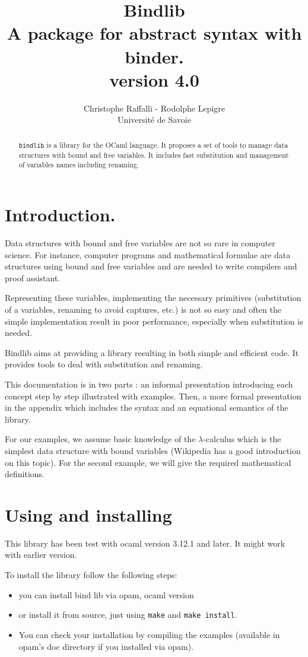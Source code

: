\documentclass[11pt]{article}
\title{Bindlib \\ A package for abstract syntax with binder. \\
          version 4.0}
\author{Christophe Raffalli - Rodolphe Lepigre\\
Université de Savoie}
\begin{document}
\maketitle

\begin{abstract}
  \verb!bindlib! is a library for the
OCaml language. It proposes a set of tools to manage data structures
with bound and free variables. It includes fast substitution and management
of variables names including renaming.
\end{abstract}

\tableofcontents

\section{Introduction.}

Data structures with bound and free variables are not so rare in
computer science. For instance, computer programs and mathematical
formulae are data structures using bound and free variables and are needed to write
compilers and proof assistant.

Representing these variables, implementing the necessary primitives
(substitution
of a variables, renaming to avoid captures, etc.) is not so easy and
often the simple implementation result in poor performance, especially
when substitution is needed.

Bindlib aims at providing a library resulting in both simple and
efficient code. It provides tools to deal with substitution and
renaming.

This documentation is in two parts : an informal presentation
introducing each concept step by step illustrated with examples. Then,
a more formal presentation in the appendix which includes the syntax
and an equational semantics of the library.

For our examples, we assume basic knowledge of the $\lambda$-calculus
which is the simplest data structure with bound variables (Wikipedia
has a good introduction on this topic). For the second example, we
will give the required mathematical definitions.

\section{Using and installing}

This library has been test with ocaml version 3.12.1 and later. It
might work with earlier version.

To install the library follow the following steps:
\begin{itemize}
\item you can install bind lib via opam,
ocaml version

\item or install it from source, just using \verb#make# and \verb#make install#.

\item You can check your installation by compiling the examples
  (available in opam's doc directory if you installed via opam).
\end{itemize}
\end{document}
